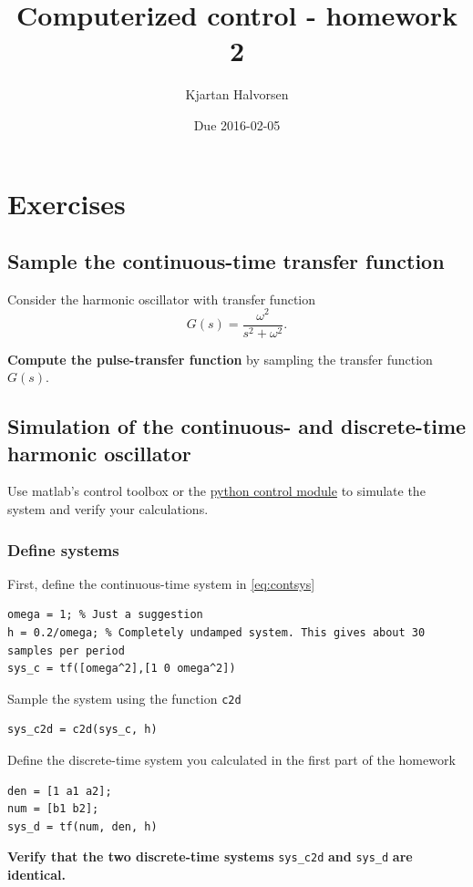 \documentclass{scrartcl}
\title{Computerized control - homework 2}
\author{Kjartan Halvorsen}
\date{Due 2016-02-05}
\begin{document}
\maketitle



\section*{Exercises}
\label{sec-1}
\subsection*{Sample the continuous-time transfer function}
\label{sec-1-1}

   Consider the harmonic oscillator with transfer function 
   \begin{equation}
    G(s) = \frac{\omega^2}{s^2 + \omega^2}.
    \label{eq:contsys}
    \end{equation}


   \textbf{Compute the pulse-transfer function} by sampling the transfer function $G(s)$. 
\subsection*{Simulation of the continuous- and discrete-time harmonic oscillator}
\label{sec-1-2}

Use matlab's control toolbox or the \href{http://python-control.sourceforge.net/}{python control module}  to simulate the system and verify your calculations. 
\subsubsection*{Define systems}
\label{sec-1-2-1}

First, define the continuous-time system in \eqref{eq:contsys}

\begin{verbatim}
omega = 1; % Just a suggestion
h = 0.2/omega; % Completely undamped system. This gives about 30 samples per period 
sys_c = tf([omega^2],[1 0 omega^2])
\end{verbatim}
Sample the system using the function \texttt{c2d}

\begin{verbatim}
sys_c2d = c2d(sys_c, h)
\end{verbatim}
Define the discrete-time system you calculated in the first part of the homework

\begin{verbatim}
den = [1 a1 a2];
num = [b1 b2];
sys_d = tf(num, den, h)
\end{verbatim}
\textbf{Verify that the two discrete-time systems} \texttt{sys\_c2d} \textbf{and} \texttt{sys\_d} \textbf{are identical.}
\end{document}
